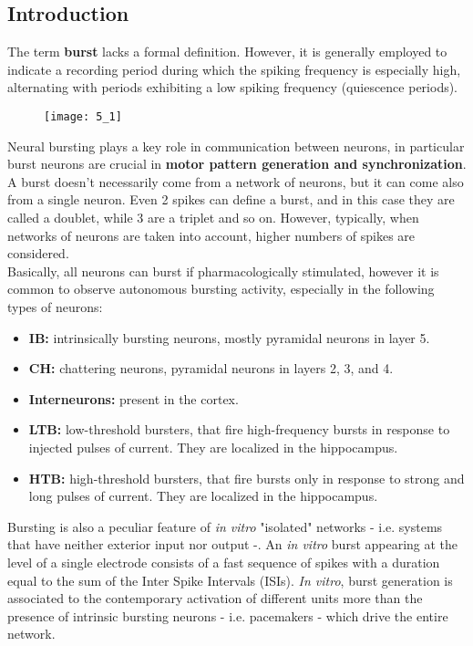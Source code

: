 \subsection{Introduction}
The term \textbf{burst} lacks a formal definition. However, it is generally employed to
indicate a recording period during which the spiking frequency is especially high,
alternating with periods exhibiting a low spiking frequency (quiescence periods).
\begin{figure}[H]
    \texttt{[image: 5\_1]}
    \centering
\end{figure}
Neural bursting plays a key role in communication between neurons, in particular
burst neurons are crucial in \textbf{motor pattern generation and synchronization}.
A burst doesn't necessarily come from a network of neurons, but it can come also from a
single neuron. Even 2 spikes can define a burst, and in this case they are called a doublet,
while 3 are a triplet and so on. However, typically, when networks of neurons are taken into
account, higher numbers of spikes are considered.\\
Basically, all neurons can burst if pharmacologically stimulated, however
it is common to observe autonomous bursting activity, especially in the following
types of neurons:
\begin{itemize}
    \item \textbf{IB:} intrinsically bursting neurons, mostly pyramidal neurons in
          layer 5.
    \item \textbf{CH:} chattering neurons, pyramidal neurons in layers 2, 3, and 4.
    \item \textbf{Interneurons:} present in the cortex.
    \item \textbf{LTB:} low-threshold bursters, that fire high-frequency bursts in
          response to injected pulses of current. They are localized in the hippocampus.
    \item \textbf{HTB:} high-threshold bursters, that fire bursts only in response to
          strong and long pulses of current. They are localized in the hippocampus.
\end{itemize}
Bursting is also a peculiar feature of \textit{in vitro} "isolated" networks - i.e. systems
that have neither exterior input nor output -.
An \textit{in vitro} burst appearing at the level of a single electrode consists of a fast
sequence of spikes with a duration equal to the sum of the Inter Spike Intervals (ISIs).
\textit{In vitro}, burst generation is associated to the contemporary activation of
different units more than the presence of intrinsic bursting neurons - i.e. pacemakers -
which drive the entire network.
